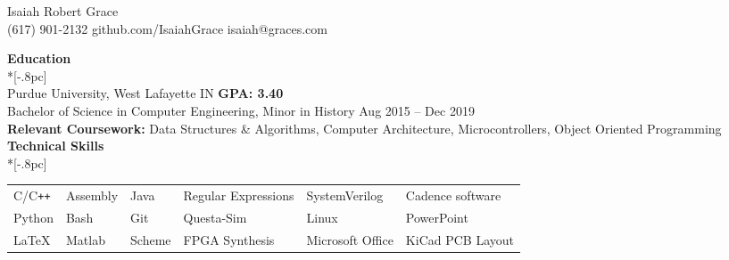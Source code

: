 \documentclass{article}
\begin{document}
\begin{center}
	\Huge{Isaiah Robert Grace}\\
	\vspace{6pt}
	\large{(617) 901-2132 \hfill github.com/IsaiahGrace \hfill isaiah@graces.com}
\end{center}

{\large \bf Education}\\*[-.8pc]
\underline{\hspace{6in}} \\
Purdue University, West Lafayette IN \hfill {\bf GPA: 3.40}\\
Bachelor of Science in Computer Engineering, Minor in History \hfill Aug 2015 -- Dec 2019\\
\textbf{Relevant Coursework:} Data Structures \& Algorithms, Computer Architecture, Microcontrollers, Object Oriented Programming
\vspace{5pt}\\
{\large \bf Technical Skills} \\*[-.8pc]
\underline{\hspace{6in}} \\
\begin{tabular*}{\textwidth}{llllll}
	C/C\texttt{++} & Assembly & Java   & Regular Expressions & SystemVerilog    & Cadence software\\
 	Python         & Bash     & Git    & Questa-Sim          & Linux            & PowerPoint\\
 	\LaTeX         & Matlab   & Scheme & FPGA Synthesis      & Microsoft Office & KiCad PCB Layout\\
\end{tabular*}
\end{document}
